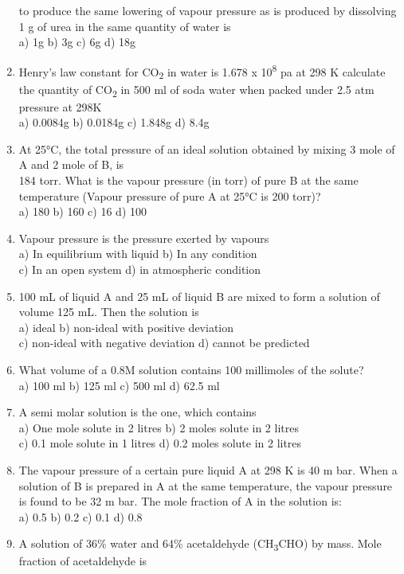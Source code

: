 \begin{enumerate}
  to produce the same lowering of vapour pressure as is produced by
  dissolving 1 g of urea in the same quantity of water is\\
  a) 1g b) 3g c) 6g d) 18g
\item
  Henry's law constant for CO\textsubscript{2} in water is 1.678 x
  10\textsuperscript{8} pa at 298 K calculate the quantity of
  CO\textsubscript{2} in 500 ml of soda water when packed under 2.5 atm
  pressure at 298K\\
  a) 0.0084g b) 0.0184g c) 1.848g d) 8.4g
\item
  At 25°C, the total pressure of an ideal solution obtained by mixing 3
  mole of A and 2 mole of B, is\\
  184 torr. What is the vapour pressure (in torr) of pure B at the same
  temperature (Vapour pressure of pure A at 25°C is 200 torr)?\\
  a) 180 b) 160 c) 16 d) 100
\item
  Vapour pressure is the pressure exerted by vapours\\
  a) In equilibrium with liquid b) In any condition\\
  c) In an open system d) in atmospheric condition
\item
  100 mL of liquid A and 25 mL of liquid B are mixed to form a solution
  of volume 125 mL. Then the solution is\\
  a) ideal b) non-ideal with positive deviation\\
  c) non-ideal with negative deviation d) cannot be predicted
\item
  What volume of a 0.8M solution contains 100 millimoles of the
  solute?\\
  a) 100 ml b) 125 ml c) 500 ml d) 62.5 ml
\item
  A semi molar solution is the one, which contains\\
  a) One mole solute in 2 litres b) 2 moles solute in 2 litres\\
  c) 0.1 mole solute in 1 litres d) 0.2 moles solute in 2 litres
\item
  The vapour pressure of a certain pure liquid A at 298 K is 40 m bar.
  When a solution of B is prepared in A at the same temperature, the
  vapour pressure is found to be 32 m bar. The mole fraction of A in the
  solution is:\\
  a) 0.5 b) 0.2 c) 0.1 d) 0.8
\item
  A solution of 36\% water and 64\% acetaldehyde
  (CH\textsubscript{3}CHO) by mass. Mole fraction of acetaldehyde is\\

\end{enumerate}
